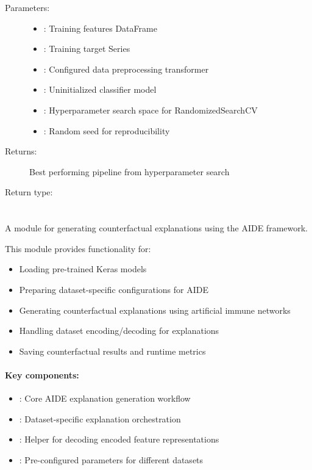 \begin{description}
    \item[Parameters:]
        \begin{itemize}
            \item {}: Training features DataFrame
            \item {}: Training target Series
            \item {}: Configured data preprocessing transformer
            \item {}: Uninitialized classifier model
            \item {}: Hyperparameter search space for RandomizedSearchCV
            \item {}: Random seed for reproducibility
        \end{itemize}
    \item[Returns:] Best performing pipeline from hyperparameter search
    \item[Return type:] 
\end{description}


\section{}
\label{sec:gen_cfs_aide}

A module for generating counterfactual explanations using the AIDE framework.

This module provides functionality for:
\begin{itemize}
    \item Loading pre-trained Keras models
    \item Preparing dataset-specific configurations for AIDE
    \item Generating counterfactual explanations using artificial immune networks
    \item Handling dataset encoding/decoding for explanations
    \item Saving counterfactual results and runtime metrics
\end{itemize}

\paragraph{Key components:}
\begin{itemize}
    \item {}: Core AIDE explanation generation workflow
    \item {}: Dataset-specific explanation orchestration
    \item {}: Helper for decoding encoded feature representations
    \item {}: Pre-configured parameters for different datasets
\end{itemize}


